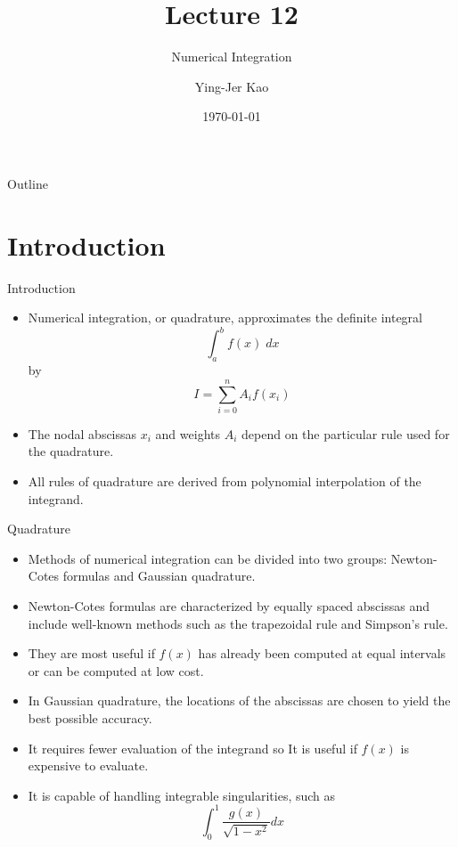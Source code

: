\documentclass{beamer}
\title[Numerical Integration] %
{Lecture 12}
\subtitle
{Numerical Integration} %
\author[Ying-Jer Kao] %
{Ying-Jer Kao}
\institute[National Taiwan University] %
{
  Department of Physics\\
 National Taiwan University
  }
\date[Numerical Analysis and Programming] %
{\today}
\begin{document}
\begin{frame}
  \titlepage
\end{frame}

\begin{frame}{Outline}
  \tableofcontents
\end{frame}



\section[Introduction]{Introduction}
\begin{frame}{Introduction}
\begin{itemize}
\item Numerical integration, or \alert{quadrature}, approximates the definite integral 
\[
\int_a^b f(x)\; dx
\]
by 
\[
I=\sum_{i=0}^n A_i f(x_i)
\]
\item The \alert{nodal abscissas} $x_i$ and \alert{weights} $A_i$ depend on the particular rule used for the quadrature.
\item All rules of quadrature are derived from \alert{ polynomial interpolation} of the integrand.
\end{itemize}
\end{frame}

\begin{frame}{Quadrature}
\begin{itemize}
\item Methods of numerical integration can be divided into two groups: Newton-Cotes formulas and Gaussian quadrature. 
\item Newton-Cotes formulas are characterized by \alert{equally spaced abscissas} and include well-known methods such as the trapezoidal rule and Simpson's rule. 
\item They are most useful if $f(x)$ has already been computed at equal intervals or can be computed at low cost.
\item In Gaussian quadrature, the locations of the abscissas are chosen to yield the \alert{best possible accuracy}.
\item  It requires fewer evaluation of the integrand so It is useful if $f(x)$ is expensive to evaluate. 
\item It is capable of handling \alert{integrable singularities}, such as
\[
\int_0^1 \frac{g(x)}{\sqrt{1-x^2}} dx
\]
\end{itemize}
\end{frame}
\end{document}
